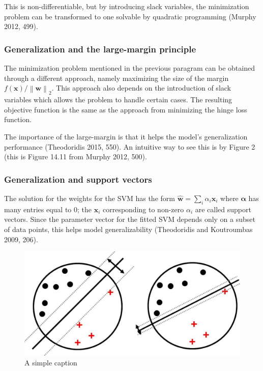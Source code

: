 \documentclass[letterpaper, 12pt]{article}
\newcommand{\norm}[1]{\left\lVert #1 \right\rVert}
\newcommand{\vect}[1]{\boldsymbol{#1}}
\begin{document}
This is non-differentiable, but by introducing slack variables, the minimization problem can be transformed to one solvable by quadratic programming (Murphy 2012, 499).

\subsubsection{Generalization and the large-margin principle}

The minimization problem mentioned in the previous paragram can be obtained through a different approach, namely maximizing the size of the margin $f(\vect{x}) / \norm{\vect{w}}_2$. This approach also depends on the introduction of slack variables which allows the problem to handle certain cases. The resulting objective function is the same as the approach from minimizing the hinge loss function.

The importance of the large-margin is that it helps the model's generalization performance (Theodoridis 2015, 550). An intuitive way to see this is by Figure 2 (this is Figure 14.11 from Murphy 2012, 500).

\subsubsection{Generalization and support vectors}

The solution for the weights for the SVM has the form $\widehat{\vect{w}} = \sum_i \alpha_i \vect{x}_i$ where $\vect{\alpha}$ has many entries equal to 0; the $\vect{x}_i$ corresponding to non-zero $\alpha_i$ are called support vectors. Since the parameter vector for the fitted SVM depends only on a subset of data points, this helps model generalizability (Theodoridis and Koutroumbas 2009, 206).

\begin{figure}[ht!]
\centering
\includegraphics[width=120mm]{largeMarginPrinciple2.jpg}
\caption{A simple caption \label{overflow}}
\end{figure}
\end{document}
